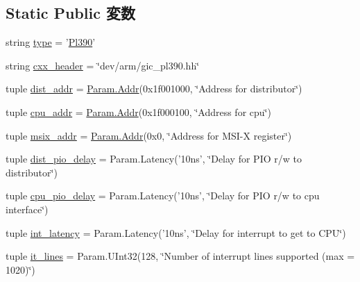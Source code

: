 \subsection*{Static Public 変数}
\begin{DoxyCompactItemize}
\item 
string \hyperlink{classGic_1_1Pl390_acce15679d830831b0bbe8ebc2a60b2ca}{type} = '\hyperlink{classGic_1_1Pl390}{Pl390}'
\item 
string \hyperlink{classGic_1_1Pl390_a17da7064bc5c518791f0c891eff05fda}{cxx\_\-header} = \char`\"{}dev/arm/gic\_\-pl390.hh\char`\"{}
\item 
tuple \hyperlink{classGic_1_1Pl390_af62011e9ced3e54b71776393aa76b720}{dist\_\-addr} = \hyperlink{base_2types_8hh_af1bb03d6a4ee096394a6749f0a169232}{Param.Addr}(0x1f001000, \char`\"{}Address for distributor\char`\"{})
\item 
tuple \hyperlink{classGic_1_1Pl390_af57b28a831d4a9c3c6789aa9a054a505}{cpu\_\-addr} = \hyperlink{base_2types_8hh_af1bb03d6a4ee096394a6749f0a169232}{Param.Addr}(0x1f000100, \char`\"{}Address for cpu\char`\"{})
\item 
tuple \hyperlink{classGic_1_1Pl390_ae51f96a31147217db6f820197bb469aa}{msix\_\-addr} = \hyperlink{base_2types_8hh_af1bb03d6a4ee096394a6749f0a169232}{Param.Addr}(0x0, \char`\"{}Address for MSI-\/X register\char`\"{})
\item 
tuple \hyperlink{classGic_1_1Pl390_a7c1607658f61f4070dc09abab68d0c5d}{dist\_\-pio\_\-delay} = Param.Latency('10ns', \char`\"{}Delay for PIO r/w to distributor\char`\"{})
\item 
tuple \hyperlink{classGic_1_1Pl390_a3075916c22552db954366fdad798c74c}{cpu\_\-pio\_\-delay} = Param.Latency('10ns', \char`\"{}Delay for PIO r/w to cpu interface\char`\"{})
\item 
tuple \hyperlink{classGic_1_1Pl390_a4843e32273ec8c1b9da3ce36ac4cd439}{int\_\-latency} = Param.Latency('10ns', \char`\"{}Delay for interrupt to get to CPU\char`\"{})
\item 
tuple \hyperlink{classGic_1_1Pl390_a139571be293d7ff174585fe7f804ef93}{it\_\-lines} = Param.UInt32(128, \char`\"{}Number of interrupt lines supported (max = 1020)\char`\"{})
\end{DoxyCompactItemize}


